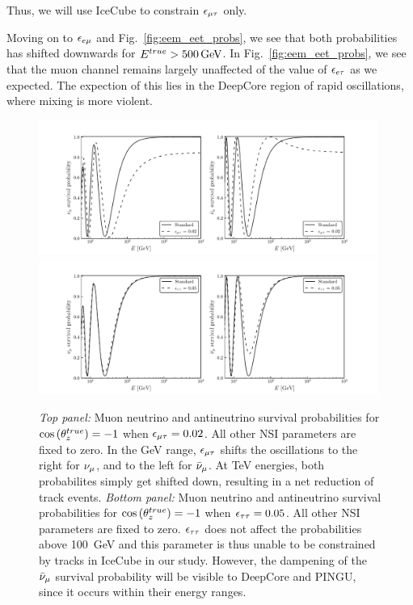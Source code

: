 Thus, we will use IceCube to constrain $\epsilon_{\mu\tau}$ only.


Moving on to $\epsilon_{e\mu}$ and Fig.~\ref{fig:eem_eet_probs}, we see that both probabilities has shifted downwards for $\Etrue > \SI{500}{\GeV}$.
In Fig.~\ref{fig:eem_eet_probs}, we see that the muon channel remains largely unaffected of the value of $\epsilon_{e\tau}$ as we expected. The expection of this lies 
in the DeepCore region of rapid oscillations, where mixing is more violent. 
\begin{figure}
    \begin{center}%
        \includegraphics[width=0.99\textwidth]{figures/emt_probs.pdf}
        \includegraphics[width=0.99\textwidth]{figures/ett_probs.pdf}
        \caption{\emph{Top panel:} Muon neutrino and antineutrino survival probabilities for
        $\cos{(\theta_z^{true})} = -1$ when $\epsilon_{\mu\tau} = 0.02$. All other NSI parameters are fixed to zero. In the \si{\GeV} range, $\epsilon_{\mu\tau}$ shifts the oscillations to the right for $\nu_\mu$, and to the left for $\bar{\nu}_\mu$. At \si{\TeV} energies, both probabilites simply get shifted down, resulting in a net reduction of track events.
        \emph{Bottom panel:} Muon neutrino and antineutrino survival probabilities for
        $\cos{(\theta_z^{true})} = -1$ when $\epsilon_{\tau\tau} = 0.05$. All other NSI parameters are fixed to zero. $\epsilon_{\tau\tau}$ does not affect the probabilities above \SI{100}{\GeV} and this parameter is thus unable to be constrained by tracks in IceCube in our study. However, the dampening of the $\bar{\nu}_\mu$ survival probability will be visible to DeepCore and PINGU, since it occurs within their energy ranges.}
        \label{fig:emt_ett_probs}
    \end{center}
\end{figure}


